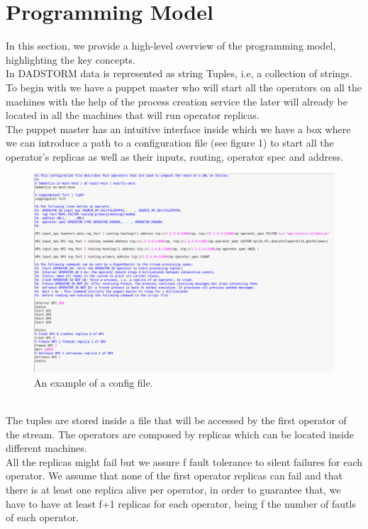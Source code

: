 \documentclass[times, 10pt, twocolumn]{article}
\begin{document}
\section{Programming Model}
In this section, we provide a high-level overview of the programming model, highlighting the key concepts. 
\\In DADSTORM data is represented as string Tuples, i.e, a collection of strings.
\\To begin with we have a puppet master who will start all the operators on all the machines with the help of the process creation service the later will already be located in all the machines that will run operator replicas.
\\The puppet master has an intuitive interface inside which we have a box where we can introduce a path to a configuration file (see figure 1) to start all the operator's replicas as well as their inputs, routing, operator spec and address.
\begin{figure}
  \includegraphics[width=\linewidth]{configFileExample.PNG}
  \caption{An example of a config file.}
\end{figure}
\\The tuples are stored inside a file that will be accessed by the first operator of the stream. The operators are composed by replicas which can be located inside different machines.
\\All the replicas might fail but we assure f fault tolerance to silent failures for each operator. We assume that none of the first operator replicas can fail and that there is at least one replica alive per operator, in order to guarantee that, we have to have at least f+1 replicas for each operator, being f the number of fautls of each operator.
\end{document}
